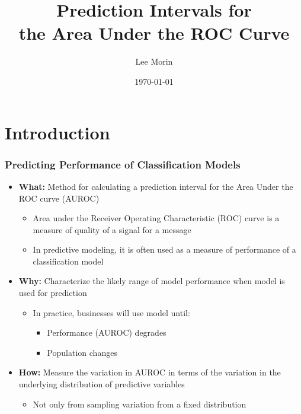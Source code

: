 \documentclass{beamer}
\title{Prediction Intervals for\\
    the Area Under the ROC Curve}
\author[Lee Morin, Queen's University]{Lee Morin}
\institute[Queen's University]
{
    Department of Economics \\
    Queen's University
}
\date{\today}
\begin{document}

\frame{\titlepage}

\section[Outline]{}

\frame{\tableofcontents}




\section{Introduction}



\begin{frame}
\frametitle{Predicting Performance of Classification Models}

\begin{itemize}
    \item \textbf{What:} Method for calculating a prediction interval for the Area Under the ROC curve (AUROC)
    \begin{itemize}
        \item Area under the Receiver Operating Characteristic (ROC) curve is a measure of quality of a signal for a message
        \item In predictive modeling, it is often used as a measure of performance of a classification model
    \end{itemize}
    \item \textbf{Why:} Characterize the likely range of model performance when model is used for prediction
    \begin{itemize}
        \item In practice, businesses will use model until:
        \begin{itemize}
            \item Performance (AUROC) degrades
            \item Population changes
        \end{itemize}
    \end{itemize}
    \item \textbf{How:} Measure the variation in AUROC in terms of the variation in the underlying distribution of predictive variables
    \begin{itemize}
        \item Not only from sampling variation from a fixed distribution
    \end{itemize}
\end{itemize}

\end{frame}






















\end{document}

